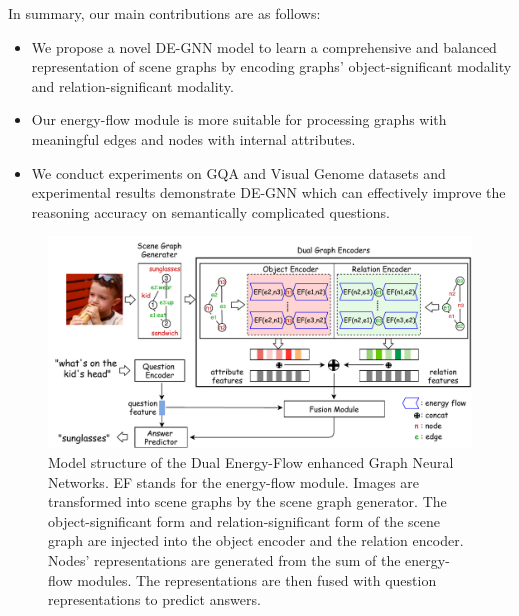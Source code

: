 \documentclass[letterpaper]{article} %
\begin{document}
In summary, our main contributions are as follows:%
\begin{itemize}
\setlength{\itemsep}{5pt}
\setlength{\parsep}{5pt}
\setlength{\parskip}{5pt}
\item We propose a novel DE-GNN model to learn a comprehensive and balanced representation of scene graphs by encoding graphs' object-significant modality and relation-significant modality.\vspace{-0.06in}

\item Our energy-flow module is more suitable for processing graphs with meaningful edges and nodes with internal attributes.\vspace{-0.06in}

\item We conduct experiments on GQA and Visual Genome datasets and experimental results demonstrate DE-GNN which can effectively improve the reasoning accuracy on semantically complicated questions.
\end{itemize}\vspace{-0.06in}

\begin{figure}[ht] 
    \centering 
    \includegraphics[width=1.0\textwidth]{./pic/DE-GNN.pdf} 
    \caption{Model structure of the Dual Energy-Flow enhanced Graph Neural Networks. EF stands for the energy-flow module. Images are transformed into scene graphs by the scene graph generator. The object-significant form and relation-significant form of the scene graph are injected into the object encoder and the relation encoder. Nodes' representations are generated from the sum of the energy-flow modules. The representations are then fused with question representations to predict answers.} 
    \label{fig2} 
\end{figure}
\end{document}
